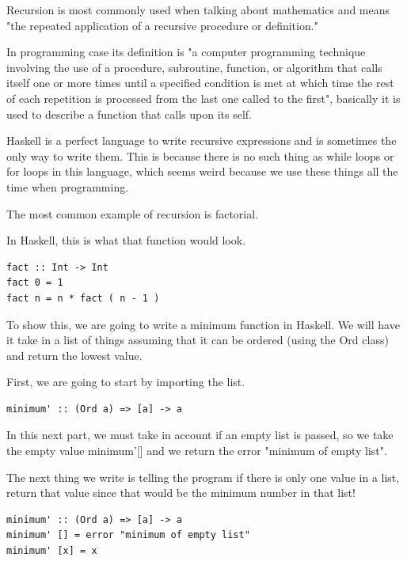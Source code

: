 \documentclass{article}
\begin{document}
\medskip\noindent
Recursion is most commonly used when talking about mathematics and means "the repeated application of a recursive procedure or definition." \cite{RR} 

\medskip\noindent
In programming case its definition is "a computer programming technique involving the use of a procedure, subroutine, function, or algorithm that calls itself one or more times until a specified condition is met at which time the rest of each repetition is processed from the last one called to the first", basically it is used to describe a function that calls upon its self. 

\medskip\noindent
Haskell is a perfect language to write recursive expressions and is sometimes the only way to write them. This is because there is no such thing as while loops or for loops in this language, which seems weird because we use these things all the time when programming. 

\medskip\noindent
The most common example of recursion is factorial. 

\medskip\noindent
In Haskell, this is what that function would look.

\medskip\noindent
\begin{lstlisting}
fact :: Int -> Int 
fact 0 = 1 
fact n = n * fact ( n - 1 )  
\end{lstlisting}

\medskip\noindent
To show this, we are going to write a minimum function \cite{MF} in Haskell. We will have it take in a list of things assuming that it can be ordered (using the Ord class) and return the lowest value.

\medskip\noindent
First, we are going to start by importing the list.

\medskip\noindent
\begin{lstlisting}
minimum' :: (Ord a) => [a] -> a  
\end{lstlisting}

\medskip\noindent
In this next part, we must take in account if an empty list is passed, so we take the empty value minimum'[] and we return the error "minimum of empty list". 

\medskip\noindent
The next thing we write is telling the program if there is only one value in a list, return that value since that would be the minimum number in that list!

\medskip\noindent
\begin{lstlisting}
minimum' :: (Ord a) => [a] -> a  
minimum' [] = error "minimum of empty list"  
minimum' [x] = x  
\end{lstlisting}
\end{document}
